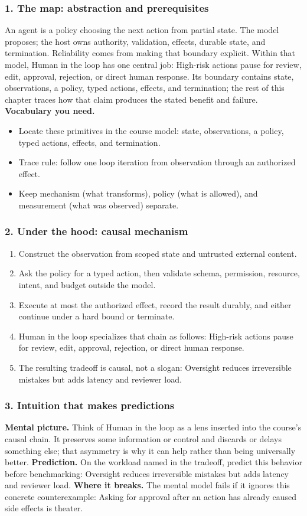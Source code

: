 \subsubsection*{1. The map: abstraction and prerequisites}
An agent is a policy choosing the next action from partial state. The model proposes; the host owns authority, validation, effects, durable state, and termination. Reliability comes from making that boundary explicit.
Within that model, Human in the loop has one central job: High-risk actions pause for review, edit, approval, rejection, or direct human response. Its boundary contains state, observations, a policy, typed actions, effects, and termination; the rest of this chapter traces how that claim produces the stated benefit and failure.
\textbf{Vocabulary you need.}\begin{itemize}
\item Locate these primitives in the course model: state, observations, a policy, typed actions, effects, and termination.
\item Trace rule: follow one loop iteration from observation through an authorized effect.
\item Keep mechanism (what transforms), policy (what is allowed), and measurement (what was observed) separate.
\end{itemize}
\subsubsection*{2. Under the hood: causal mechanism}\begin{enumerate}
\item Construct the observation from scoped state and untrusted external content.
\item Ask the policy for a typed action, then validate schema, permission, resource, intent, and budget outside the model.
\item Execute at most the authorized effect, record the result durably, and either continue under a hard bound or terminate.
\item Human in the loop specializes that chain as follows: High-risk actions pause for review, edit, approval, rejection, or direct human response.
\item The resulting tradeoff is causal, not a slogan: Oversight reduces irreversible mistakes but adds latency and reviewer load.
\end{enumerate}
\subsubsection*{3. Intuition that makes predictions}
\textbf{Mental picture.} Think of Human in the loop as a lens inserted into the course's causal chain. It preserves some information or control and discards or delays something else; that asymmetry is why it can help rather than being universally better.
\textbf{Prediction.} On the workload named in the tradeoff, predict this behavior before benchmarking: Oversight reduces irreversible mistakes but adds latency and reviewer load.
\textbf{Where it breaks.} The mental model fails if it ignores this concrete counterexample: Asking for approval after an action has already caused side effects is theater.
